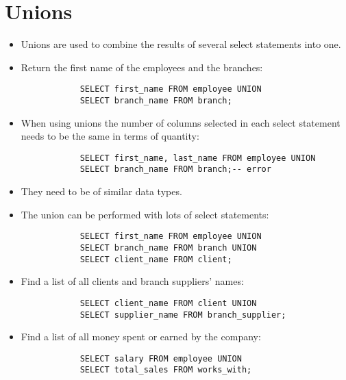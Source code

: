 \section{Unions}
\begin{itemize}
    \item Unions are used to combine the results of several select statements into one.
    \item Return the first name of the employees and the branches:
        \begin{verbatim}
            SELECT first_name FROM employee UNION
            SELECT branch_name FROM branch;
        \end{verbatim}
    
    \item When using unions the number of columns selected in each select statement needs to be the same in terms of quantity:
        \begin{verbatim}
            SELECT first_name, last_name FROM employee UNION
            SELECT branch_name FROM branch;-- error
        \end{verbatim}
    
    \item They need to be of similar data types.
    \item The union can be performed with lots of select statements:
        \begin{verbatim}
            SELECT first_name FROM employee UNION
            SELECT branch_name FROM branch UNION
            SELECT client_name FROM client;
        \end{verbatim}
    
    \item Find a list of all clients and branch suppliers' names:
        \begin{verbatim}
            SELECT client_name FROM client UNION 
            SELECT supplier_name FROM branch_supplier;
        \end{verbatim}
    
    \item Find a list of all money spent or earned by the company:
        \begin{verbatim}
            SELECT salary FROM employee UNION 
            SELECT total_sales FROM works_with;
        \end{verbatim}
\end{itemize}
